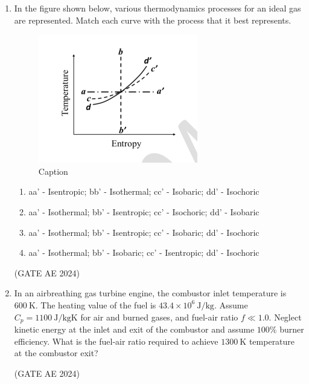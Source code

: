 \documentclass[journal,12pt,onecolumn]{IEEEtran}
\theoremstyle{remark}
\begin{document}
\begin{enumerate}
\item In the figure shown below, various thermodynamics processes for an ideal gas are represented. Match each curve with the process that it best represents.  

\begin{figure}[H]
    \centering
    \includegraphics[width=0.5\columnwidth]{figs/Screenshot from 2025-08-23 15-28-11.png}
    \caption{Caption}
    \label{fig:placeholder}
\end{figure}

\begin{enumerate}
\item aa' - Isentropic; bb' - Isothermal; cc' - Isobaric; dd' - Isochoric
\item aa' -  Isothermal; bb' - Isentropic; cc' - Isochoric; dd' - Isobaric
\item aa' - Isothermal; bb' - Isentropic; cc' - Isobaric; dd' - Isochoric
\item aa' - Isothermal; bb' - Isobaric; cc' - Isentropic; dd' - Isochoric
\end{enumerate}
\hfill(GATE AE 2024)

\item In an airbreathing gas turbine engine, the combustor inlet temperature is $600 \ \text{K}$. The heating value of the fuel is $43.4 \times 10^6 \ \text{J/kg}$. Assume $C_p = 1100 \ \text{J/kgK}$ for air and burned gases, and fuel-air ratio $f \ll 1.0$. Neglect kinetic energy at the inlet and exit of the combustor and assume $100\%$ burner efficiency. What is the fuel-air ratio required to achieve $1300 \ \text{K}$ temperature at the combustor exit?  

\begin{enumerate}
\end{enumerate}
\hfill(GATE AE 2024)


\end{enumerate}
\end{document}
